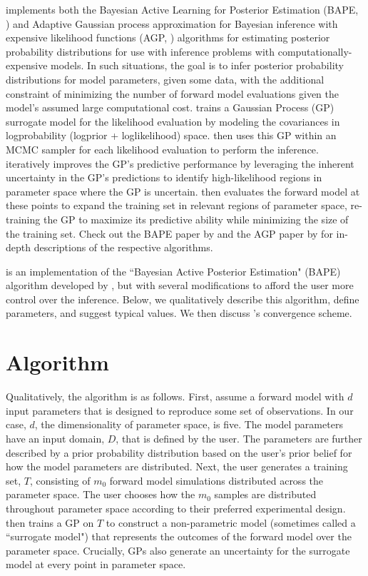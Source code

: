 \approxposterior implements both the Bayesian Active Learning for Posterior Estimation (BAPE, \citet{Kandasamy2017}) and Adaptive Gaussian process approximation for Bayesian inference with expensive likelihood functions (AGP, \citet{Wang2018}) algorithms for estimating posterior probability distributions for use with inference problems with computationally-expensive models. In such situations, the goal is to infer posterior probability distributions for model parameters, given some data, with the additional constraint of minimizing the number of forward model evaluations given the model's assumed large computational cost. \approxposterior trains a Gaussian Process (GP) surrogate model for the likelihood evaluation by modeling the covariances in logprobability (logprior + loglikelihood) space. \approxposterior then uses this GP within an MCMC sampler for each likelihood evaluation to perform the inference. \approxposterior iteratively improves the GP's predictive performance by leveraging the inherent uncertainty in the GP's predictions to identify high-likelihood regions in parameter space where the GP is uncertain. \approxposterior then evaluates the forward model at these points to expand the training set in relevant regions of parameter space, re-training the GP to maximize its predictive ability while minimizing the size of the training set. Check out the BAPE paper by \citet{Kandasamy2017} and the AGP paper by \citet{Wang2018} for in-depth descriptions of the respective algorithms.

\approxposterior is an implementation of the ``Bayesian Active Posterior Estimation" (BAPE) algorithm developed by \citet{Kandasamy2017}, but with several modifications to afford the user more control over the inference. Below, we qualitatively describe this algorithm, define parameters, and suggest typical values. We then discuss \approxposterior's convergence scheme.

\section{\approxposterior Algorithm} \label{AP:sec:app}

Qualitatively, the \approxposterior algorithm is as follows. First, assume a forward model with $d$ input parameters that is designed to reproduce some set of observations. In our case, $d$, the dimensionality of parameter space, is five. The model parameters have an input domain, $D$, that is defined by the user. The parameters are further described by a prior probability distribution based on the user's prior belief for how the model parameters are distributed.  Next, the user generates a training set, $T$, consisting of $m_0$ forward model simulations distributed across the parameter space. The user chooses how the $m_0$ samples are distributed throughout parameter space according to their preferred experimental design. \approxposterior then trains a GP on $T$ to construct a non-parametric model (sometimes called a ``surrogate model") that represents the outcomes of the forward model over the parameter space. Crucially, GPs also generate an uncertainty for the surrogate model at every point in parameter space.


